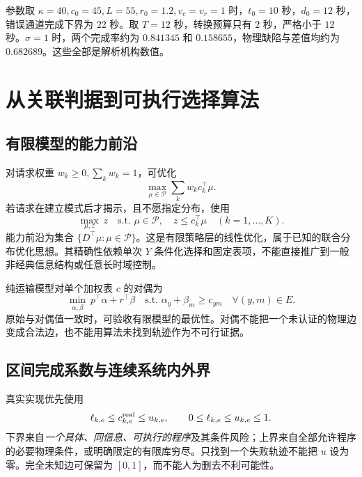 \documentclass[UTF8,11pt,a4paper,fontset=fandol]{ctexart}
\numberwithin{equation}{section}
\theoremstyle{definition}
\begin{document}
参数取 $\kappa=40,c_0=45,L=55,r_0=1.2,v_c=v_r=1$ 时，$t_0=10$ 秒，$d_0=12$ 秒，错误通道完成下界为 $22$ 秒。取 $T=12$ 秒，转换预算只有 $2$ 秒，严格小于 $12$ 秒。$\sigma=1$ 时，两个完成率约为 $0.841345$ 和 $0.158655$，物理缺陷与差值均约为 $0.682689$。这些全部是解析机构数值。

\section{从关联判据到可执行选择算法}
\label{sec:algorithm}

\subsection{有限模型的能力前沿}
对请求权重 $w_k\ge0,\sum_kw_k=1$，可优化
\begin{equation}
\max_{\mu\in\mathcal P}\sum_kw_k c_k^\top\mu.
\end{equation}
若请求在建立模式后才揭示，且不愿指定分布，使用
\begin{equation}
\max_{\mu,z}\ z\quad\text{s.t. }\mu\in\mathcal P,\quad
z\le c_k^\top\mu\quad(k=1,\ldots,K).
\label{eq:maximin}
\end{equation}
能力前沿为集合 $\{D^\top\mu:\mu\in\mathcal P\}$。这是有限策略层的线性优化，属于已知的联合分布优化思想\cite{strategicmeasures}。其精确性依赖单次 $Y$ 条件化选择和固定表项，不能直接推广到一般非经典信息结构或任意长时域控制。

纯运输模型对单个加权表 $c$ 的对偶为
\begin{equation}
\min_{\alpha,\beta}\ p^\top\alpha+r^\top\beta
\quad\text{s.t. }\alpha_y+\beta_m\ge c_{ym}\quad\forall (y,m)\in E.
\label{eq:dual}
\end{equation}
原始与对偶值一致时，可验收有限模型的最优性。对偶不能把一个未认证的物理边变成合法边，也不能用算法未找到轨迹作为不可行证据。

\subsection{区间完成系数与连续系统内外界}
真实实现优先使用
\begin{equation}
\ell_{k,e}\le c_{k,e}^{\rm real}\le u_{k,e},\qquad 0\le\ell_{k,e}\le u_{k,e}\le1.
\label{eq:intervals}
\end{equation}
下界来自\emph{一个具体、同信息、可执行的程序}及其条件风险；上界来自全部允许程序的必要物理条件，或明确限定的有限库穷尽。只找到一个失败轨迹不能把 $u$ 设为零。完全未知边可保留为 $[0,1]$，而不能人为删去不利可能性。
\end{document}
